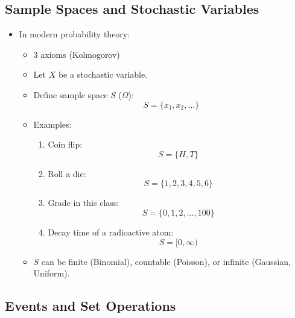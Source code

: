 \subsection{Sample Spaces and Stochastic Variables}

\begin{itemize}
      \item In modern probability theory:
            \begin{itemize}
                  \item 3 axioms (Kolmogorov)
                  \item Let $X$ be a stochastic variable.
                  \item Define sample space $S$ ($\Omega$):
                        \[ S = \{x_1, x_2, ...\} \]
                  \item Examples:
                        \begin{enumerate}
                              \item Coin flip:
                                    \[ S = \{H, T\} \]
                              \item Roll a die:
                                    \[ S = \{1, 2, 3, 4, 5, 6\} \]
                              \item Grade in this class:
                                    \[ S = \{0, 1, 2, ..., 100\} \]
                              \item Decay time of a radioactive atom:
                                    \[ S = [0, \infty) \]
                        \end{enumerate}
                  \item $S$ can be finite (Binomial), countable (Poisson), or infinite (Gaussian, Uniform).
            \end{itemize}
\end{itemize}

\subsection{Events and Set Operations}

